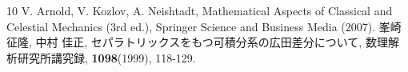 \documentclass[a4paper]{ujarticle}
\numberwithin{equation}{section}
\theoremstyle{definition}
\begin{document}
    \begin{thebibliography}{10} 
        \nocite{*}
         V. Arnold, V. Kozlov, A. Neishtadt, Mathematical Aspects of Classical and Celestial Mechanics (3rd ed.), Springer Science and Business Media (2007).
         峯崎 征隆, 中村 佳正, セパラトリックスをもつ可積分系の広田差分について, 数理解析研究所講究録, \textbf{1098}(1999), 118-129.
    \end{thebibliography}
\end{document}
